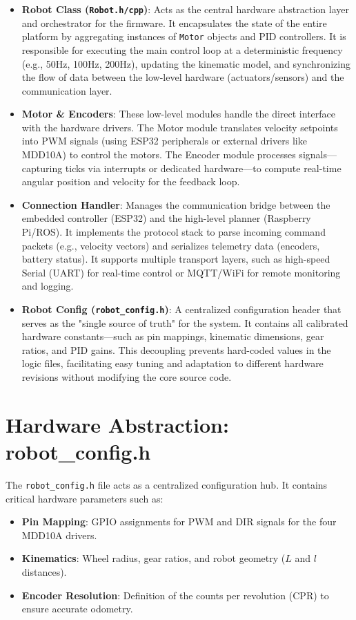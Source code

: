 \begin{itemize}
    \item \textbf{Robot Class (\texttt{Robot.h/cpp})}: 
    Acts as the central hardware abstraction layer and orchestrator for the firmware. It encapsulates the state of the entire platform by aggregating instances of \texttt{Motor} objects and PID controllers. It is responsible for executing the main control loop at a deterministic frequency (e.g., 50Hz, 100Hz, 200Hz), updating the kinematic model, and synchronizing the flow of data between the low-level hardware (actuators/sensors) and the communication layer.

    \item \textbf{Motor \& Encoders}: 
    These low-level modules handle the direct interface with the hardware drivers. The Motor module translates velocity setpoints into PWM signals (using ESP32 peripherals or external drivers like MDD10A) to control the motors. The Encoder module processes signals—capturing ticks via interrupts or dedicated hardware—to compute real-time angular position and velocity for the feedback loop.

    \item \textbf{Connection Handler}: 
    Manages the communication bridge between the embedded controller (ESP32) and the high-level planner (Raspberry Pi/ROS). It implements the protocol stack to parse incoming command packets (e.g., velocity vectors) and serializes telemetry data (encoders, battery status). It supports multiple transport layers, such as high-speed Serial (UART) for real-time control or MQTT/WiFi for remote monitoring and logging.

    \item \textbf{Robot Config (\texttt{robot\_config.h})}: 
    A centralized configuration header that serves as the "single source of truth" for the system. It contains all calibrated hardware constants—such as pin mappings, kinematic dimensions, gear ratios, and PID gains. This decoupling prevents hard-coded values in the logic files, facilitating easy tuning and adaptation to different hardware revisions without modifying the core source code.
    
\end{itemize}

\section{Hardware Abstraction: robot\_config.h}

The \texttt{robot\_config.h} file acts as a centralized configuration hub. It contains critical hardware parameters such as:
\begin{itemize}
    \item \textbf{Pin Mapping}: GPIO assignments for PWM and DIR signals for the four MDD10A drivers.
    \item \textbf{Kinematics}: Wheel radius, gear ratios, and robot geometry ($L$ and $l$ distances).
    \item \textbf{Encoder Resolution}: Definition of the counts per revolution (CPR) to ensure accurate odometry.
\end{itemize}

